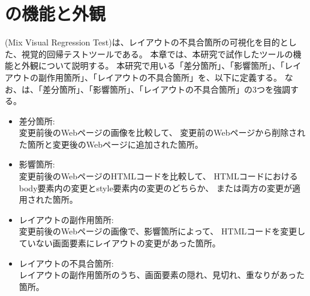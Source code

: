 \chapter{ \toolName の機能と外観}\label{cha:Function}
\toolName (Mix Visual Regression Test)は、レイアウトの不具合箇所の可視化を目的とした、視覚的回帰テストツールである。
本章では、本研究で試作したツール\toolName の機能と外観について説明する。
本研究で用いる「差分箇所」、「影響箇所」、「レイアウトの副作用箇所」、「レイアウトの不具合箇所」を、以下に定義する。
なお、\toolName は、「差分箇所」、「影響箇所」、「レイアウトの不具合箇所」の3つを強調する。
\begin{itemize}
    \item 差分箇所:\\
          変更前後のWebページの画像を比較して、
          変更前のWebページから削除された箇所と変更後のWebページに追加された箇所。
    \item 影響箇所:\\
          変更前後のWebページのHTMLコードを比較して、
          HTMLコードにおけるbody要素内の変更とstyle要素内の変更のどちらか、
          または両方の変更が適用された箇所。
    \item レイアウトの副作用箇所:\\
          変更前後のWebページの画像で、影響箇所によって、
          HTMLコードを変更していない画面要素にレイアウトの変更があった箇所。
    \item レイアウトの不具合箇所:\\
          レイアウトの副作用箇所のうち、画面要素の隠れ、見切れ、重なりがあった箇所。
\end{itemize}

